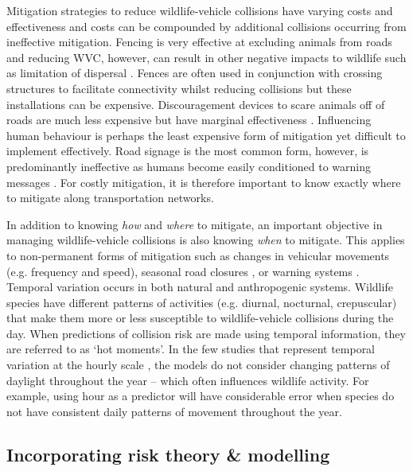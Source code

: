 Mitigation strategies to reduce wildlife-vehicle collisions have varying costs and effectiveness \citep{huij09} and costs can be compounded by additional collisions occurring from ineffective mitigation. Fencing is very effective at excluding animals from roads and reducing WVC, however, can result in other negative impacts to wildlife such as limitation of dispersal \citep[i.e. barrier effects, see][]{jaeg04}. Fences are often used in conjunction with crossing structures to facilitate connectivity whilst reducing collisions but these installations can be expensive. Discouragement devices to scare animals off of roads are much less expensive but have marginal effectiveness \citep{bend03,sche03}. Influencing human behaviour is perhaps the least expensive form of mitigation yet difficult to implement effectively. Road signage is the most common form, however, is predominantly ineffective as humans become easily conditioned to warning messages \citep{bond13}. For costly mitigation, it is therefore important to know exactly where to mitigate along transportation networks.

In addition to knowing \textit{how} and \textit{where} to mitigate, an important objective in managing wildlife-vehicle collisions is also knowing \textit{when} to mitigate. This applies to non-permanent forms of mitigation such as changes in vehicular movements (e.g. frequency and speed), seasonal road closures \citep[see][]{hilt12}, or warning systems \citep[but see][for review of automated signs]{huij03}. Temporal variation occurs in both natural and anthropogenic systems. Wildlife species have different patterns of activities (e.g. diurnal, nocturnal, crepuscular) that make them more or less susceptible to wildlife-vehicle collisions during the day. When predictions of collision risk are made using temporal information, they are referred to as `hot moments'. In the few studies that represent temporal variation at the hourly scale \citep[e.g.][]{neum12}, the models do not consider changing patterns of daylight throughout the year -- which often influences wildlife activity. For example, using hour as a predictor will have considerable error when species do not have consistent daily patterns of movement throughout the year. 

\subsection{Incorporating risk theory \& modelling}

